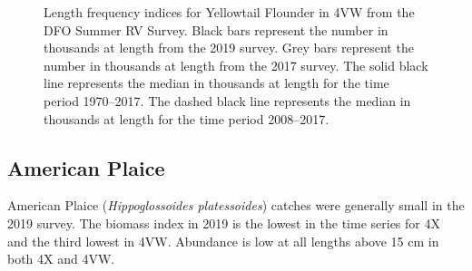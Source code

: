 \documentclass[11pt]{book}
\begin{document}
\begin{figure}[htb]

{\centering {} 

}

\caption{Length frequency indices for Yellowtail Flounder in 4VW from the DFO Summer RV Survey. Black bars represent the number in thousands at length from the 2019 survey. Grey bars represent the number in thousands at length from the 2017 survey. The solid black line represents the median in thousands at length for the time period 1970--2017. The dashed black line represents the median in thousands at length for the time period 2008--2017.}\label{fig:49-fig-ytflounder-lengthfreq4VW}
\end{figure}
\clearpage

\hypertarget{american-plaice}{%
\subsection{American Plaice}\label{american-plaice}}

American Plaice (\emph{Hippoglossoides platessoides}) catches were generally small in the 2019 survey. The biomass index in 2019 is the lowest in the time series for 4X and the third lowest in 4VW. Abundance is low at all lengths above 15 cm in both 4X and 4VW.
\end{document}

